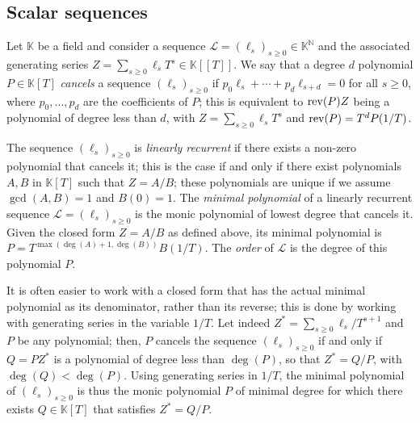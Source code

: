 \documentclass[12pt]{article}
\newcommand{\genseries}{Z}
\def\N {\ensuremath{\mathbb{N}}}
\def\K{\mathbb{K}}
\def\K {\ensuremath{\mathbb{K}}}
\begin{document}

\subsection{Scalar sequences} \label{section:linseq}

Let $\K$ be a field and consider a sequence $\mathcal{L}=(\ell_s)_{s
  \ge 0} \in \K^\N$ and the associated generating series
$\genseries=\sum_{s \ge 0} \ell_s T^s \in \K[[T]]$. We say that a
degree $d$ polynomial $P\in\K[T]$ {\em cancels} a sequence
$(\ell_s)_{s \ge 0}$ if $p_0 \ell_s + \cdots + p_d \ell_{s+d}=0$ for
all $s \ge 0$, where $p_0,\dots,p_d$ are the coefficients of $P$; this
is equivalent to ${\rm rev}(P) \genseries$ being a polynomial of
degree less than $d$, with $\genseries=\sum_{s \ge 0} \ell_s T^s$ and
${\rm rev}(P)=T^d P(1/T)$.

The sequence $(\ell_s)_{s \ge 0}$ is {\em linearly recurrent} if there
exists a non-zero polynomial that cancels it; this is the case if and
only if there exist polynomials $A,B$ in $\K[T]$ such that
$\genseries=A/B$; these polynomials are unique if we assume
$\gcd(A,B)=1$ and $B(0)=1$.  The {\em minimal polynomial} of a linearly
recurrent sequence $\mathcal{L}=(\ell_s)_{s \ge 0}$ is the monic polynomial of
lowest degree that cancels it. Given the closed form $\genseries =
A/B$ as defined above, its minimal polynomial is $P =
T^{\max(\deg(A)+1,\deg(B))}B(1/T)$. The {\em order} of $\mathcal{L}$ is the
degree of this polynomial $P$.

It is often easier to work with a closed form that has the actual
minimal polynomial as its denominator, rather than its reverse; this
is done by working with generating series in the variable $1/T$.
Let indeed $\genseries^* = \sum_{s\ge0} \ell_s / T^{s+1}$ and $P$ be
any polynomial; then, $P$ cancels the sequence
$(\ell_s)_{s\ge0}$ if and only if $Q=P \genseries^* $ is a polynomial
of degree less than $\deg(P)$, so that $\genseries^*=Q/P$, with $\deg(Q)<
\deg(P)$.  Using generating series in $1/T$, the minimal polynomial of
$(\ell_s)_{s \ge 0}$ is thus the monic polynomial $P$ of minimal degree for
which there exists $Q \in \K[T]$ that satisfies $\genseries^*=Q/P$.
\end{document}
